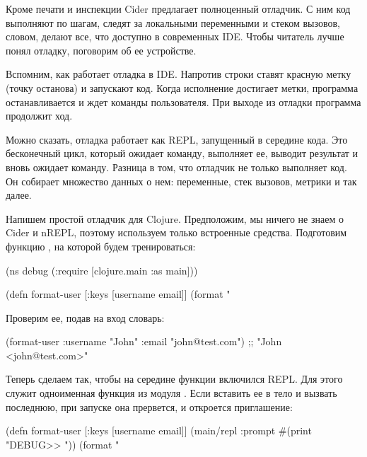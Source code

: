 Кроме печати и инспекции Cider предлагает полноценный отладчик. С ним код выполняют по шагам, следят за локальными переменными и стеком вызовов, словом, делают все, что доступно в современных IDE. Чтобы читатель лучше понял отладку, поговорим об ее устройстве.

Вспомним, как работает отладка в IDE. Напротив строки ставят красную метку (точку останова) и запускают код. Когда исполнение достигает метки, программа останавливается и ждет команды пользователя. При выходе из отладки программа продолжит ход.

Можно сказать, отладка работает как REPL, запущенный в середине кода. Это бесконечный цикл, который ожидает команду, выполняет ее, выводит результат и вновь ожидает команду. Разница в том, что отладчик не только выполняет код. Он собирает множество данных о нем: переменные, стек вызовов, метрики и так далее.

Напишем простой отладчик для Clojure. Предположим, мы ничего не знаем о Cider и nREPL, поэтому используем только встроенные средства. Подготовим функцию , на которой будем тренироваться:

\begin{english}
  \begin{clojure}
(ns debug
  (:require [clojure.main :as main]))

(defn format-user
  [{:keys [username email]}]
  (format "%
  \end{clojure}
\end{english}

Проверим ее, подав на вход словарь:

\begin{english}
  \begin{clojure}
(format-user {:username "John"
              :email "john@test.com"})
;; "John <john@test.com>"
  \end{clojure}
\end{english}

Теперь сделаем так, чтобы на середине функции включился REPL. Для этого служит одноименная функция из модуля . Если вставить ее в тело  и вызвать последнюю, при запуске она прервется, и откроется приглашение:

\begin{english}
  \begin{clojure/lines}
(defn format-user
  [{:keys [username email]}]
  (main/repl :prompt #(print "DEBUG>> "))
  (format "%
  \end{clojure/lines}
\end{english}

